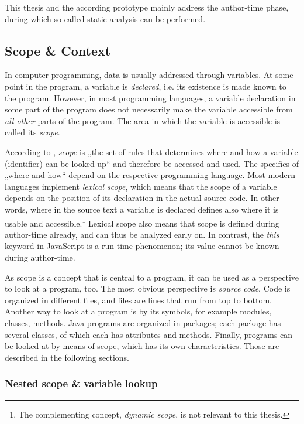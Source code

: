 This thesis and the according prototype mainly address the author-time
phase, during which so-called static analysis can be performed.

\subsection{Scope \& Context}\label{scope-context}

In computer programming, data is usually addressed through variables. At
some point in the program, a variable is \emph{declared}, i.e. its
existence is made known to the program. However, in most programming
languages, a variable declaration in some part of the program does not
necessarily make the variable accessible from \emph{all other} parts of
the program. The area in which the variable is accessible is called its
\emph{scope}.

According to , \emph{scope} is „the set of rules that
determines where and how a variable (identifier) can be looked-up“ and
therefore be accessed and used. The specifics of „where and how“ depend
on the respective programming language. Most modern languages implement
\emph{lexical scope}, which means that the scope of a variable depends
on the position of its declaration in the actual source code. In other
words, where in the source text a variable is declared defines also
where it is usable and
accessible.\footnote{The complementing concept, \emph{dynamic scope}, is not relevant to this thesis.}
Lexical scope also means that scope is defined during author-time
already, and can thus be analyzed early on. In contrast, the \emph{this}
keyword in JavaScript is a run-time phenomenon; its value cannot be
known during author-time.

As scope is a concept that is central to a program, it can be used as a
perspective to look at a program, too. The most obvious perspective is
\emph{source code}. Code is organized in different files, and files are
lines that run from top to bottom. Another way to look at a program is
by its symbols, for example modules, classes, methods. Java programs are
organized in packages; each package has several classes, of which each
has attributes and methods. Finally, programs can be looked at by means
of scope, which has its own characteristics. Those are described in the
following sections.

\subsubsection{Nested scope \& variable
lookup}\label{nested-scope-variable-lookup}

